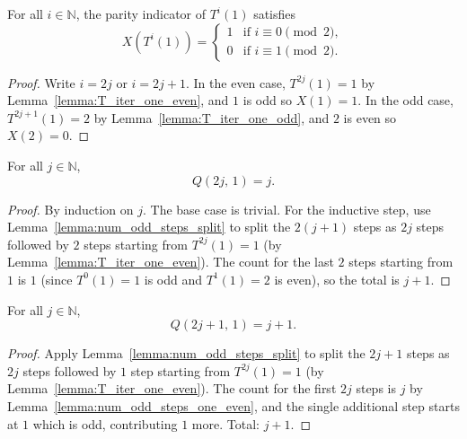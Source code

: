 \begin{lemma}\label{lemma:X_T_iter_one}\leanok
For all $i \in \mathbb{N}$, the parity indicator of $T^i(1)$ satisfies
\[
  X(T^i(1)) =
  \begin{cases}
    1 & \text{if } i \equiv 0 \pmod{2}, \\
    0 & \text{if } i \equiv 1 \pmod{2}.
  \end{cases}
\]
\end{lemma}
\begin{proof}\leanok
Write $i = 2j$ or $i = 2j + 1$.
In the even case, $T^{2j}(1) = 1$ by Lemma~\ref{lemma:T_iter_one_even}, and $1$ is odd so $X(1) = 1$.
In the odd case, $T^{2j+1}(1) = 2$ by Lemma~\ref{lemma:T_iter_one_odd}, and $2$ is even so $X(2) = 0$.
\end{proof}

\begin{lemma}\label{lemma:num_odd_steps_one_even}\leanok
For all $j \in \mathbb{N}$,
\[
  Q(2j,\, 1) = j.
\]
\end{lemma}
\begin{proof}\leanok
By induction on $j$. The base case is trivial. For the inductive step, use Lemma~\ref{lemma:num_odd_steps_split} to split the $2(j+1)$ steps as $2j$ steps followed by $2$ steps starting from $T^{2j}(1) = 1$ (by Lemma~\ref{lemma:T_iter_one_even}). The count for the last $2$ steps starting from $1$ is $1$ (since $T^0(1) = 1$ is odd and $T^1(1) = 2$ is even), so the total is $j + 1$.
\end{proof}

\begin{lemma}\label{lemma:num_odd_steps_one_odd}\leanok
For all $j \in \mathbb{N}$,
\[
  Q(2j+1,\, 1) = j + 1.
\]
\end{lemma}
\begin{proof}\leanok
Apply Lemma~\ref{lemma:num_odd_steps_split} to split the $2j+1$ steps as $2j$ steps followed by $1$ step starting from $T^{2j}(1) = 1$ (by Lemma~\ref{lemma:T_iter_one_even}). The count for the first $2j$ steps is $j$ by Lemma~\ref{lemma:num_odd_steps_one_even}, and the single additional step starts at $1$ which is odd, contributing $1$ more. Total: $j + 1$.
\end{proof}

